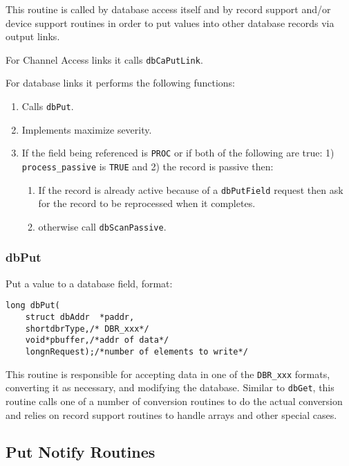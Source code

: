 This routine is called by database access itself and by record support and/or device support routines in order to put values into other database records via output links.

For Channel Access links it calls \verb|dbCaPutLink|.

For database links it performs the following functions:

\begin{enumerate}
\item Calls \verb|dbPut|.

\item Implements maximize severity.

\item If the field being referenced is \verb|PROC| or if both of the following are true: 1) \verb|process_passive| is \verb|TRUE| and 2) the record is passive then:

\begin{enumerate}

\item If the record is already active because of a \verb|dbPutField| request then ask for the record to be reprocessed when it completes.

\item otherwise call \verb|dbScanPassive|.

\end{enumerate}
\end{enumerate}

\subsubsection{dbPut}

Put a value to a database field, format:

\begin{verbatim}
long dbPut(
    struct dbAddr  *paddr,
    shortdbrType,/* DBR_xxx*/
    void*pbuffer,/*addr of data*/
    longnRequest);/*number of elements to write*/
\end{verbatim}

This routine is responsible for accepting data in one of the \verb|DBR_xxx| formats, converting it as necessary, and modifying 
the database.
Similar to \verb|dbGet|, this routine calls one of a number of conversion routines to do the actual conversion and relies on record support routines to handle arrays and other special cases.

\subsection{Put Notify Routines}

